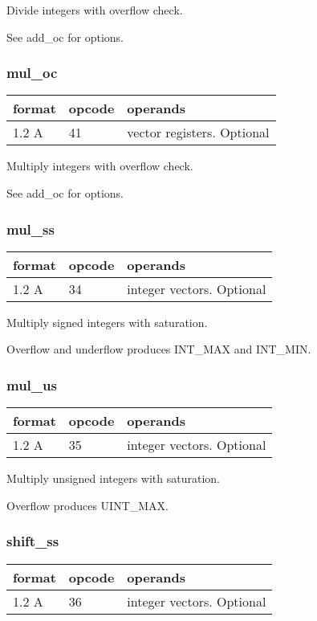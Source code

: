 \documentclass[forwardcom.tex]{subfiles}
\begin{document}
Divide integers with overflow check.

See add\_oc for options.

\subsubsection{mul\_oc}
\label{table:mulOcInstruction}
\begin{tabular}{|p{12mm}|p{12mm}|p{110mm}|}
\hline
\bfseries format & \bfseries opcode & \bfseries operands \\ \hline
1.2 A & 41 & vector registers. Optional \\ \hline
\end{tabular}
\vspace{2mm}

Multiply integers with overflow check.

See add\_oc for options.

\subsubsection{mul\_ss}
\label{table:mulSsInstruction}
\begin{tabular}{|p{12mm}|p{12mm}|p{110mm}|}
\hline
\bfseries format & \bfseries opcode & \bfseries operands \\ \hline
1.2 A & 34 & integer vectors. Optional \\ \hline
\end{tabular}
\vspace{2mm}

Multiply signed integers with saturation.

Overflow and underflow produces INT\_MAX and INT\_MIN.

\subsubsection{mul\_us}
\label{table:mulUsInstruction}
\begin{tabular}{|p{12mm}|p{12mm}|p{110mm}|}
\hline
\bfseries format & \bfseries opcode & \bfseries operands \\ \hline
1.2 A & 35 & integer vectors. Optional \\ \hline
\end{tabular}
\vspace{2mm}

Multiply unsigned integers with saturation.

Overflow produces UINT\_MAX.

\subsubsection{shift\_ss}
\label{table:shiftSsInstruction}
\begin{tabular}{|p{12mm}|p{12mm}|p{110mm}|}
\hline
\bfseries format & \bfseries opcode & \bfseries operands \\ \hline
1.2 A & 36 & integer vectors. Optional \\ \hline
\end{tabular}
\vspace{2mm}
\end{document}
